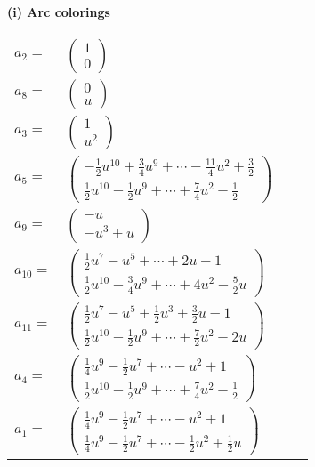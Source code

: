 \documentclass[1p]{elsarticle_modified}
\theoremstyle{definition}
\begin{document}
\flushleft \textbf{(i) Arc colorings}\\
\begin{tabular}{m{7pt} m{180pt} m{7pt} m{180pt} }
\flushright $a_{2}=$&$\begin{pmatrix}1\\0\end{pmatrix}$ \\
\flushright $a_{8}=$&$\begin{pmatrix}0\\u\end{pmatrix}$ \\
\flushright $a_{3}=$&$\begin{pmatrix}1\\u^2\end{pmatrix}$ \\
\flushright $a_{5}=$&$\begin{pmatrix}-\frac{1}{2} u^{10}+\frac{3}{4} u^9+\cdots-\frac{11}{4} u^2+\frac{3}{2}\\\frac{1}{2} u^{10}-\frac{1}{2} u^9+\cdots+\frac{7}{4} u^2-\frac{1}{2}\end{pmatrix}$ \\
\flushright $a_{9}=$&$\begin{pmatrix}- u\\- u^3+u\end{pmatrix}$ \\
\flushright $a_{10}=$&$\begin{pmatrix}\frac{1}{2} u^7- u^5+\cdots+2 u-1\\\frac{1}{2} u^{10}-\frac{3}{4} u^9+\cdots+4 u^2-\frac{5}{2} u\end{pmatrix}$ \\
\flushright $a_{11}=$&$\begin{pmatrix}\frac{1}{2} u^7- u^5+\frac{1}{2} u^3+\frac{3}{2} u-1\\\frac{1}{2} u^{10}-\frac{1}{2} u^9+\cdots+\frac{7}{2} u^2-2 u\end{pmatrix}$ \\
\flushright $a_{4}=$&$\begin{pmatrix}\frac{1}{4} u^9-\frac{1}{2} u^7+\cdots- u^2+1\\\frac{1}{2} u^{10}-\frac{1}{2} u^9+\cdots+\frac{7}{4} u^2-\frac{1}{2}\end{pmatrix}$ \\
\flushright $a_{1}=$&$\begin{pmatrix}\frac{1}{4} u^9-\frac{1}{2} u^7+\cdots- u^2+1\\\frac{1}{4} u^9-\frac{1}{2} u^7+\cdots-\frac{1}{2} u^2+\frac{1}{2} u\end{pmatrix}$ \\

\end{tabular}
\end{document}
